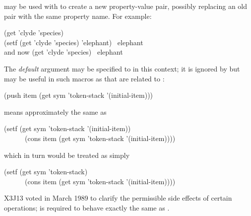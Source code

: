\begin{defun}[Function]
 may be used with  to create a new property-value
pair, possibly replacing an old pair with the same property name.
For example:
\begin{lisp}
(get 'clyde 'species) \EV\ {\false} \\
(setf (get 'clyde 'species) 'elephant) \EV\ elephant \\
\textrm{and now} (get 'clyde 'species) \EV\ elephant
\end{lisp}
The \emph{default} argument may be
specified to  in this context; it is ignored by  but
may be useful in such macros as  that are related to :
\begin{lisp}
(push item (get sym 'token-stack '(initial-item)))
\end{lisp}
means approximately the same as
\begin{lisp}
(setf (get sym 'token-stack '(initial-item)) \\
~~~~~~(cons item (get sym 'token-stack '(initial-item))))
\end{lisp}
which in turn would be treated as simply
\begin{lisp}
(setf (get sym 'token-stack) \\
~~~~~~(cons item (get sym 'token-stack '(initial-item))))
\end{lisp}

\begin{newer}
X3J13 voted in March 1989 
to clarify the permissible side effects of certain operations;
is required to behave exactly the same as
.
\end{newer}
\end{defun}

